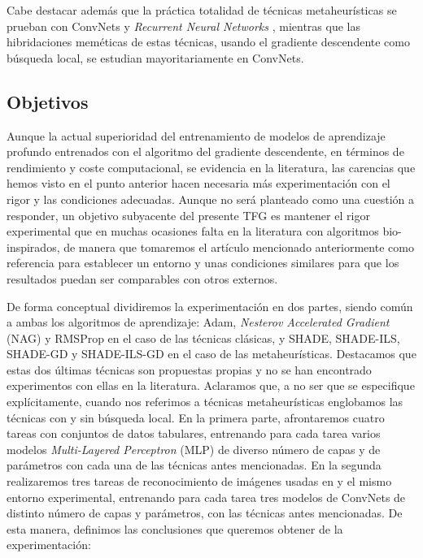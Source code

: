 Cabe destacar además que la práctica totalidad de técnicas metaheurísticas se prueban con ConvNets y \textit{Recurrent Neural Networks} \cite{divedeeplearning}, mientras que las hibridaciones meméticas de estas técnicas, usando el gradiente descendente como búsqueda local, se estudian mayoritariamente en ConvNets.



\subsection{Objetivos}\label{sec:objinf}

Aunque la actual superioridad del entrenamiento de modelos de aprendizaje profundo entrenados con el algoritmo del gradiente descendente, en términos de rendimiento y coste computacional, se evidencia en la literatura, las carencias que hemos visto en el punto anterior hacen necesaria más experimentación con el rigor y las condiciones adecuadas. Aunque no será planteado como una cuestión a responder, un objetivo subyacente del presente TFG es mantener el rigor experimental que en muchas ocasiones falta en la literatura con algoritmos bio-inspirados, de manera que tomaremos el artículo mencionado anteriormente como referencia para establecer un entorno y unas condiciones similares para que los resultados puedan ser comparables con otros externos.


De forma conceptual dividiremos la experimentación en dos partes, siendo común a ambas los algoritmos de aprendizaje: Adam, \textit{Nesterov Accelerated Gradient} (NAG) y RMSProp en el caso de las técnicas clásicas, y SHADE, SHADE-ILS, SHADE-GD y SHADE-ILS-GD en el caso de las metaheurísticas. Destacamos que estas dos últimas técnicas son propuestas propias y no se han encontrado experimentos con ellas en la literatura. Aclaramos que, a no ser que se especifique explícitamente, cuando nos referimos a técnicas metaheurísticas englobamos las técnicas con y sin búsqueda local. En la primera parte, afrontaremos cuatro tareas con conjuntos de datos tabulares, entrenando para cada tarea varios modelos \textit{Multi-Layered Perceptron} (MLP) de diverso número de capas y de parámetros con cada una de las técnicas antes mencionadas. En la segunda realizaremos tres tareas de reconocimiento de imágenes usadas en \cite{MHtrainingClase} y el mismo entorno experimental, entrenando para cada tarea tres modelos de ConvNets de distinto número de capas y parámetros, con las técnicas antes mencionadas. De esta manera, definimos las conclusiones que queremos obtener de la experimentación:

